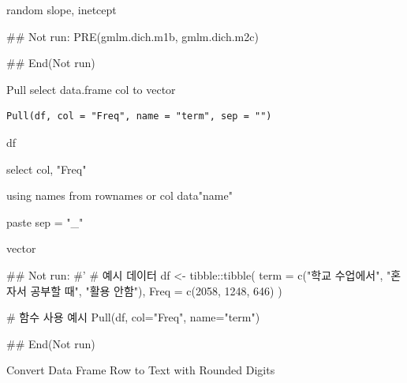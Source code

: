 \documentclass[a4paper]{book}
\begin{document}
%
\begin{Value}
random slope, inetcept
\end{Value}
%
\begin{Examples}
\begin{ExampleCode}
\#\# Not run: 
 PRE(gmlm.dich.m1b, gmlm.dich.m2c)

## End(Not run)
\end{ExampleCode}
\end{Examples}
%
\begin{Description}
Pull select data.frame col to vector
\end{Description}
%
\begin{Usage}
\begin{verbatim}
Pull(df, col = "Freq", name = "term", sep = "")
\end{verbatim}
\end{Usage}
%
\begin{Arguments}
\begin{ldescription}
\item[\code{df}] df

\item[\code{col}] select col, "Freq"

\item[\code{name}] using names from rownames or col data"name"

\item[\code{sep}] paste sep = "\_"
\end{ldescription}
\end{Arguments}
%
\begin{Value}
vector
\end{Value}
%
\begin{Examples}
\begin{ExampleCode}

\#\# Not run: 
#'
# 예시 데이터
df <- tibble::tibble(
  term = c("학교 수업에서", "혼자서 공부할 때", "활용 안함"),
  Freq = c(2058, 1248, 646)
)

# 함수 사용 예시
Pull(df, col="Freq", name="term")

## End(Not run)

\end{ExampleCode}
\end{Examples}
%
\begin{Description}
Convert Data Frame Row to Text with Rounded Digits
\end{Description}
\end{document}
